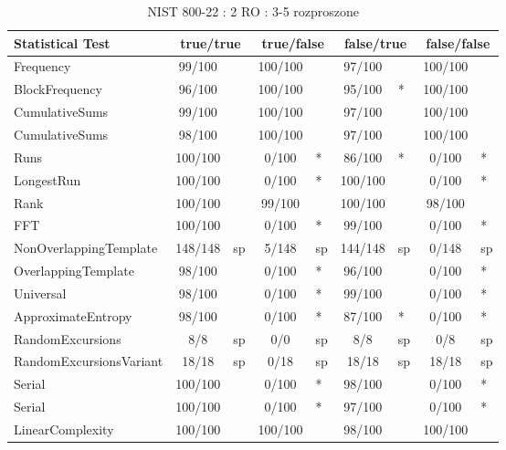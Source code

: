 \begin{table}[H]
\centering
\caption{NIST 800-22 : 2 RO : 3-5 rozproszone}
\label{tab:ch4_nist_22_2RO_8I_DISTRIBUTED}
\begin{tabular}{|l|c|l|c|l|c|l|c|l|}
\hline
\textbf{Statistical Test} & \multicolumn{2}{c|}{\textbf{true/true}} & \multicolumn{2}{c|}{\textbf{true/false}} & \multicolumn{2}{c|}{\textbf{false/true}} & \multicolumn{2}{c|}{\textbf{false/false}} \\ \hline
Frequency               &  99/100 &     & 100/100 &     &  97/100 &     & 100/100 &     \\ \hline
BlockFrequency          &  96/100 &     & 100/100 &     &  95/100 & *   & 100/100 &     \\ \hline
CumulativeSums          &  99/100 &     & 100/100 &     &  97/100 &     & 100/100 &     \\ \hline
CumulativeSums          &  98/100 &     & 100/100 &     &  97/100 &     & 100/100 &     \\ \hline
Runs                    & 100/100 &     &   0/100 & *   &  86/100 & *   &   0/100 & *   \\ \hline
LongestRun              & 100/100 &     &   0/100 & *   & 100/100 &     &   0/100 & *   \\ \hline
Rank                    & 100/100 &     &  99/100 &     & 100/100 &     &  98/100 &     \\ \hline
FFT                     & 100/100 &     &   0/100 & *   &  99/100 &     &   0/100 & *   \\ \hline
NonOverlappingTemplate  & 148/148 & sp  &   5/148 & sp  & 144/148 & sp  &   0/148 & sp  \\ \hline
OverlappingTemplate     &  98/100 &     &   0/100 & *   &  96/100 &     &   0/100 & *   \\ \hline
Universal               &  98/100 &     &   0/100 & *   &  99/100 &     &   0/100 & *   \\ \hline
ApproximateEntropy      &  98/100 &     &   0/100 & *   &  87/100 & *   &   0/100 & *   \\ \hline
RandomExcursions        &     8/8 & sp  &     0/0 & sp  &     8/8 & sp  &     0/8 & sp  \\ \hline
RandomExcursionsVariant &   18/18 & sp  &    0/18 & sp  &   18/18 & sp  &   18/18 & sp  \\ \hline
Serial                  & 100/100 &     &   0/100 & *   &  98/100 &     &   0/100 & *   \\ \hline
Serial                  & 100/100 &     &   0/100 & *   &  97/100 &     &   0/100 & *   \\ \hline
LinearComplexity        & 100/100 &     & 100/100 &     &  98/100 &     & 100/100 &     \\ \hline
\end{tabular}
\end{table}



